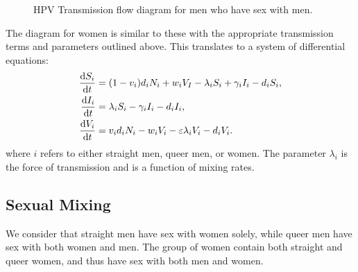 \documentclass[12pt]{article}
\begin{document}
%
\begin{figure}[h!]
\begin{center}
\end{center}
\caption{HPV Transmission flow diagram for men who have sex with men.}
\label{fig:flowQueer}
\end{figure}
The diagram for women is similar to these with the appropriate transmission terms and parameters outlined above. This translates to a system of differential equations:
\begin{align}
\frac{\mathrm{d}S_i}{\mathrm{d}t}&=(1-v_i)d_iN_i + w_iV_I - \lambda_iS_i + \gamma_iI_i - d_iS_i,\\
\frac{\mathrm{d}I_i}{\mathrm{d}t}&= \lambda_iS_i - \gamma_iI_i- d_iI_i,\\
\frac{\mathrm{d}V_i}{\mathrm{d}t}&= v_id_iN_i - w_iV_i - \varepsilon \lambda_iV_i - d_iV_i.
\end{align}
where $i$ refers to either straight men, queer men, or women.  The parameter $\lambda_i$ is the force of transmission and is a function of mixing rates.  

\subsection*{Sexual Mixing}

We consider that straight men have sex with women solely, while queer men have sex with both women and men.  The group of women contain both straight and queer women, and thus have sex with both men and women.  
\end{document}
